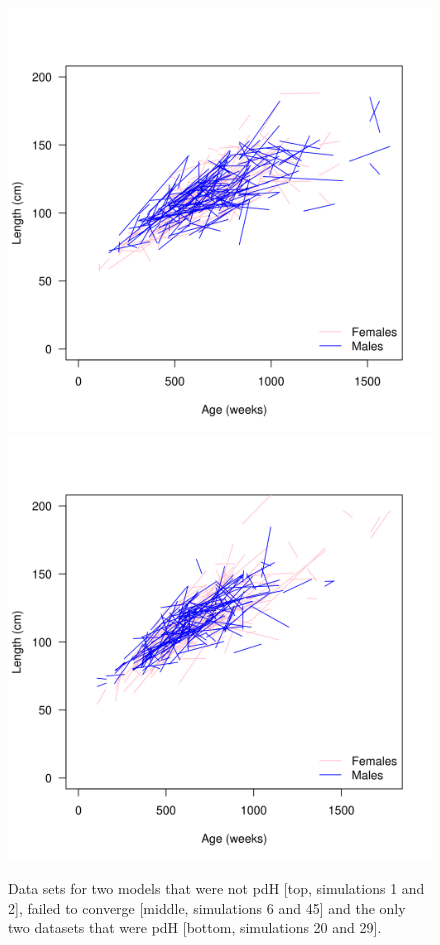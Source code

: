 \documentclass[11pt, a4paper]{article}
\begin{document}
\begin{figure}[!htbp]
  \includegraphics[width=0.49\linewidth]{../simulation/sims/growth-20.png}
  \includegraphics[width=0.49\linewidth]{../simulation/sims/growth-29.png}
  \begin{quote}
    \caption{Data sets for two models that were not pdH [top, simulations 1 and
      2], failed to converge [middle, simulations 6 and 45] and the only two
      datasets that were pdH [bottom, simulations 20 and 29].}
  \label{fig:1}
  \end{quote}
\end{figure}




%
%
\end{document}
